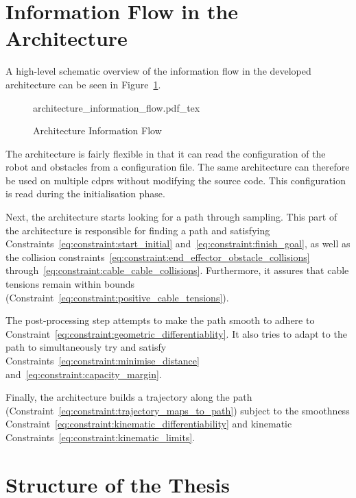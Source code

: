 	\section{Information Flow in the Architecture}

		A high-level schematic overview of the information flow in the developed
		architecture can be seen in
		Figure~\ref{fig:architecture_information_flow}.

		\begin{figure}[hbt]
			\centering
			\def\svgwidth{\columnwidth}
			{architecture_information_flow.pdf_tex}
			\caption{Architecture Information Flow}
			\label{fig:architecture_information_flow}
		\end{figure}

		The architecture is fairly flexible in that it can read the
		configuration of the robot and obstacles from a configuration file. The
		same architecture can therefore be used on multiple \glspl{cdpr} without
		modifying the source code. This configuration is read during the
		initialisation phase.

		Next, the architecture starts looking for a path through sampling. This
		part of the architecture is responsible for finding a path and
		satisfying Constraints~\ref{eq:constraint:start_initial}
		and~\ref{eq:constraint:finish_goal}, as well as the collision
		constraints~\ref{eq:constraint:end_effector_obstacle_collisions}
		through~\ref{eq:constraint:cable_cable_collisions}. Furthermore, it
		assures that cable tensions remain within bounds
		(Constraint~\ref{eq:constraint:positive_cable_tensions}).

		The post-processing step attempts to make the path smooth to adhere to
		Constraint~\ref{eq:constraint:geometric_differentiablity}. It also tries
		to adapt to the path to simultaneously try and satisfy
		Constraints~\ref{eq:constraint:minimise_distance}
		and~\ref{eq:constraint:capacity_margin}.

		Finally, the architecture builds a trajectory along the path
		(Constraint~\ref{eq:constraint:trajectory_maps_to_path}) subject to the
		smoothness Constraint~\ref{eq:constraint:kinematic_differentiability}
		and kinematic Constraints~\ref{eq:constraint:kinematic_limits}.

	\section{Structure of the Thesis}


